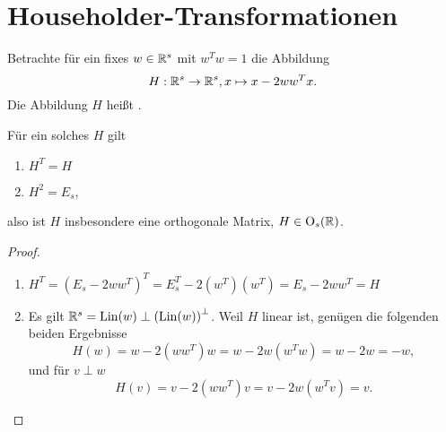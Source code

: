 \section{Householder-Transformationen}
Betrachte für ein fixes $w\in \mathbb{R}^s$ mit $w^Tw=1$ die Abbildung
\[
H:\mathbb{R}^s\to \mathbb{R}^s,x\mapsto x-2ww^Tx.
\]
Die Abbildung $H$ heißt .
\begin{prop}\label{2:hprop}
  Für ein solches $H$ gilt
  \begin{enumerate}
    \item $H^T=H$
    \item $H^2=E_s$,
  \end{enumerate}
  also ist $H$ insbesondere eine orthogonale Matrix, $H\in \operatorname{O}_{s}(\mathbb{R})$.
\end{prop}
\begin{proof}
  \begin{enumerate}
    \item $H^T=(E_s-2ww^T)^T=E_s^T-2(w^T)(w^T)=E_s-2ww^T=H$\color{purple}
    \item  Es gilt $\mathbb{R}^s=\mathrm{Lin}(w)\perp \left(\mathrm{Lin}(w)\right)^{\perp}$. Weil $H$ linear ist, genügen die folgenden beiden Ergebnisse
    \[H(w) = w-2(ww^T)w = w-2w(w^Tw) = w-2w=-w,
    \]
    und für $v\perp w$
    \[
    H(v) = v-2(ww^T)v=v-2w(w^Tv)=v.
    \]
  \end{enumerate}
  \color{black}
\end{proof}


\lec
